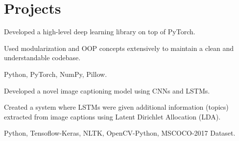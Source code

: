 
\section{Projects}

\begin{tightemize}
\item Developed a high-level deep learning library on top of PyTorch.
\item Used modularization and OOP concepts extensively to maintain a clean and understandable codebase.
\item {} Python, PyTorch, NumPy, Pillow.
\end{tightemize}
\sectionsep

\begin{tightemize}
\item Developed a novel image captioning model using CNNs and LSTMs.
\item Created a system where LSTMs were given additional information (topics) extracted from image captions using Latent Dirichlet Allocation (LDA).
\item {} Python, Tensoflow-Keras, NLTK, OpenCV-Python, MSCOCO-2017 Dataset.
\end{tightemize}
\sectionsep
